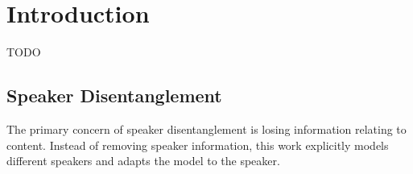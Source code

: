 \section{Introduction}

TODO
\subsection{Speaker Disentanglement}

The primary concern of speaker disentanglement is losing information relating to content.
Instead of removing speaker information, this work explicitly models different speakers and adapts the model to the speaker.

